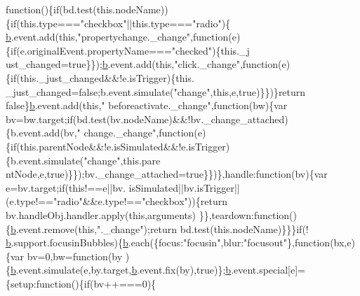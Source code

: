 \begin{DoxyCode}
{      function}()\{\textcolor{keywordflow}{if}(bd.test(\textcolor{keyword}{this}.nodeName))\{\textcolor{keywordflow}{if}(this.type===\textcolor{stringliteral}{"checkbox"}||this.type===\textcolor{stringliteral}{"radio"})\{
      \hyperlink{a00039_aa4026ad5544b958e54ce5e106fa1c805}{b}.event.add(\textcolor{keyword}{this},\textcolor{stringliteral}{"propertychange.\_change"},\textcolor{keyword}{function}(e)\{\textcolor{keywordflow}{if}(e.originalEvent.propertyName===\textcolor{stringliteral}{"checked"})\{this.\_j
      ust\_changed=true\}\});\hyperlink{a00039_aa4026ad5544b958e54ce5e106fa1c805}{b}.event.add(\textcolor{keyword}{this},\textcolor{stringliteral}{"click.\_change"},\textcolor{keyword}{function}(e)\{\textcolor{keywordflow}{if}(this.\_just\_changed&&!e.isTrigger)\{this.
      \_just\_changed=false;b.event.simulate(\textcolor{stringliteral}{"change"},this,e,true)\}\})\}\textcolor{keywordflow}{return} \textcolor{keyword}{false}\}\hyperlink{a00039_aa4026ad5544b958e54ce5e106fa1c805}{b}.event.add(\textcolor{keyword}{this},\textcolor{stringliteral}{"
      beforeactivate.\_change"},\textcolor{keyword}{function}(bw)\{var bv=bw.target;if(bd.test(bv.nodeName)&&!bv.\_change\_attached)\{b.event.add(bv,\textcolor{stringliteral}{"
      change.\_change"},function(e)\{if(this.parentNode&&!e.isSimulated&&!e.isTrigger)\{b.event.simulate(\textcolor{stringliteral}{"change"},this.pare
      ntNode,e,true)\}\});bv.\_change\_attached=true\}\})\},handle:\textcolor{keyword}{function}(bv)\{var e=bv.target;\textcolor{keywordflow}{if}(\textcolor{keyword}{this}!==e||bv.
      isSimulated||bv.isTrigger||(e.type!==\textcolor{stringliteral}{"radio"}&&e.type!==\textcolor{stringliteral}{"checkbox"}))\{\textcolor{keywordflow}{return} bv.handleObj.handler.apply(\textcolor{keyword}{this},arguments)
      \}\},teardown:\textcolor{keyword}{function}()\{\hyperlink{a00039_aa4026ad5544b958e54ce5e106fa1c805}{b}.event.remove(\textcolor{keyword}{this},\textcolor{stringliteral}{".\_change"});\textcolor{keywordflow}{return} bd.test(this.nodeName)\}\}\}\textcolor{keywordflow}{if}(!
      \hyperlink{a00039_aa4026ad5544b958e54ce5e106fa1c805}{b}.support.focusinBubbles)\{\hyperlink{a00039_aa4026ad5544b958e54ce5e106fa1c805}{b}.each(\{focus:\textcolor{stringliteral}{"focusin"},blur:\textcolor{stringliteral}{"focusout"}\},\textcolor{keyword}{function}(bx,e)\{var bv=0,bw=\textcolor{keyword}{function}(by
      )\{\hyperlink{a00039_aa4026ad5544b958e54ce5e106fa1c805}{b}.event.simulate(e,by.target,\hyperlink{a00039_aa4026ad5544b958e54ce5e106fa1c805}{b}.event.fix(by),\textcolor{keyword}{true})\};\hyperlink{a00039_aa4026ad5544b958e54ce5e106fa1c805}{b}.event.special[e]=\{setup:\textcolor{keyword}{function}()\{\textcolor{keywordflow}{if}(bv++===0)\{

\end{DoxyCode}
